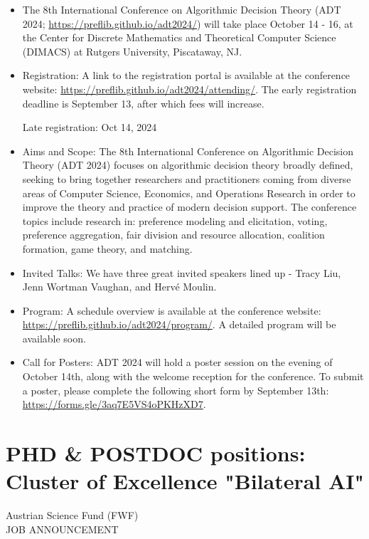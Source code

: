 \documentclass[prodmode,acmtecs]{acmsmall} %
\begin{document}
\begin{itemize}\item  The 8th International Conference on Algorithmic Decision Theory (ADT 2024; \href{https://preflib.github.io/adt2024/}{https://preflib.github.io/adt2024/}) will take place October 14 - 16, at the Center for Discrete Mathematics and Theoretical Computer Science (DIMACS) at Rutgers University, Piscataway, NJ. 
 
\item  Registration: A link to the registration portal is available at the conference website: \href{https://preflib.github.io/adt2024/attending/}{https://preflib.github.io/adt2024/attending/}. The early registration deadline is September 13, after which fees will increase. 
 
Late registration: Oct 14, 2024 
 
\item  Aims and Scope: The 8th International Conference on Algorithmic Decision Theory (ADT 2024) focuses on algorithmic decision theory broadly defined, seeking to bring together researchers and practitioners coming from diverse areas of Computer Science, Economics, and Operations Research in order to improve the theory and practice of modern decision support. The conference topics include research in: preference modeling and elicitation, voting, preference aggregation, fair division and resource allocation, coalition formation, game theory, and matching. 
 
\item  Invited Talks: We have three great invited speakers lined up - Tracy Liu, Jenn Wortman Vaughan, and Hervé Moulin. 
 
\item  Program: A schedule overview is available at the conference website: \href{https://preflib.github.io/adt2024/program/}{https://preflib.github.io/adt2024/program/}. A detailed program will be available soon. 
 
\item  Call for Posters: ADT 2024 will hold a poster session on the evening of October 14th, along with the welcome reception for the conference. To submit a poster, please complete the following short form by September 13th: \href{https://forms.gle/3aq7E5VS4oPKHzXD7}{https://forms.gle/3aq7E5VS4oPKHzXD7}. 
 
\end{itemize}\section{PHD \& POSTDOC positions: Cluster of Excellence "Bilateral AI"}\label{PHDPOSTDOCpositions}  Austrian Science Fund (FWF)\\ 
JOB ANNOUNCEMENT 
\end{document}
